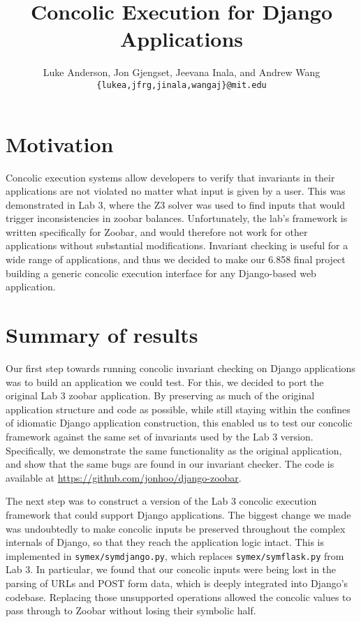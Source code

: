 \documentclass{article}
\author{
Luke Anderson, Jon Gjengset, Jeevana Inala, and Andrew Wang \\
\texttt{\{lukea,jfrg,jinala,wangaj\}@mit.edu}
}
\title{Concolic Execution for Django Applications}
\date{}
\begin{document}
\maketitle
\section{Motivation}
Concolic execution systems allow developers to verify that invariants in their
applications are not violated no matter what input is given by a user. This was
demonstrated in Lab 3, where the Z3 solver was used to find inputs that would
trigger inconsistencies in zoobar balances. Unfortunately, the lab's framework
is written specifically for Zoobar, and would therefore not work for other
applications without substantial modifications.  Invariant checking is useful
for a wide range of applications, and thus we decided to make our 6.858 final
project building a generic concolic execution interface for any Django-based
web application.

\section{Summary of results}

Our first step towards running concolic invariant checking on Django
applications was to build an application we could test. For this, we decided to
port the original Lab 3 zoobar application. By preserving as much of the
original application structure and code as possible, while still staying within the
confines of idiomatic Django application construction, this enabled us to test
our concolic framework against the same set of invariants used by the Lab 3
version. Specifically, we demonstrate the same functionality as the original
application, and show that the same bugs are found in our invariant checker.
The code is available at \url{https://github.com/jonhoo/django-zoobar}.

The next step was to construct a version of the Lab 3 concolic execution
framework that could support Django applications. The biggest change
we made was undoubtedly to make concolic inputs be preserved throughout the
complex internals of Django, so that they reach the application logic
intact. This is implemented in \texttt{symex/symdjango.py}, which replaces
\texttt{symex/symflask.py} from Lab 3. In particular, we found that our
concolic inputs were being lost in the parsing of URLs and POST form data,
which is deeply integrated into Django's codebase. Replacing those unsupported
operations allowed the concolic values to pass through to Zoobar without losing
their symbolic half.
\end{document}
